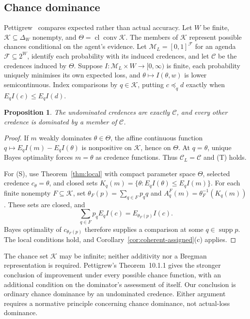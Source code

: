 \documentclass[11pt]{article}
\newtheorem{proposition}[theorem]{Proposition}
\theoremstyle{definition}
\theoremstyle{remark}
\newcommand{\M}{\mathcal M}
\newcommand{\C}{\mathcal C}
\newcommand{\supp}{\operatorname{supp}}
\begin{document}
\subsection{Chance dominance}\label{sec:chance}
Pettigrew~\cite[Chapter~10]{Pettigrew2016} compares expected rather than actual accuracy. Let $W$ be finite, $\mathcal K\subseteq\Delta_W$ nonempty, and $\Theta=\operatorname{cl}\operatorname{conv}\mathcal K$. The members of $\mathcal K$ represent possible chances conditional on the agent's evidence. Let $\M_L=[0,1]^{\mathcal F}$ for an agenda $\mathcal F\subseteq2^W$, identify each probability with its induced credences, and let $\C$ be the credences induced by $\Theta$. Suppose $I:\M_L\times W\to[0,\infty)$ is finite, each probability uniquely minimises its own expected loss, and $\theta\mapsto I(\theta,w)$ is lower semicontinuous. Index comparisons by $q\in\mathcal K$, putting $c\preceq_q d$ exactly when $E_qI(c)\le E_qI(d)$.
\begin{proposition}\label{prop:short-chance}
The undominated credences are exactly $\C$, and every other credence is dominated by a member of $\C$.
\end{proposition}
\begin{proof}
If $m$ weakly dominates $\theta\in\Theta$, the affine continuous function $q\mapsto E_qI(m)-E_qI(\theta)$ is nonpositive on $\mathcal K$, hence on $\Theta$. At $q=\theta$, unique Bayes optimality forces $m=\theta$ as credence functions. Thus $\C_L=\C$ and (T) holds.

For (S), use Theorem~\ref{thm:local} with compact parameter space $\Theta$, selected credence $c_\theta=\theta$, and closed sets $K_q(m)=\{\theta:E_qI(\theta)\le E_qI(m)\}$. For each finite nonempty $F\subseteq\mathcal K$, set $\theta_F(p)=\sum_{q\in F}p_qq$ and $A^F_q(m)=\theta_F^{-1}(K_q(m))$. These sets are closed, and
\[
\sum_{q\in F}p_qE_qI(c)=E_{\theta_F(p)}I(c).
\]
Bayes optimality of $c_{\theta_F(p)}$ therefore supplies a comparison at some $q\in\supp p$. The local conditions hold, and Corollary~\ref{cor:coherent-assigned}(c) applies.
\end{proof}
The chance set $\mathcal K$ may be infinite; neither additivity nor a Bregman representation is required. Pettigrew's Theorem~10.1.1 gives the stronger conclusion of improvement under every possible chance function, with an additional condition on the dominator's assessment of itself. Our conclusion is ordinary chance dominance by an undominated credence. Either argument requires a normative principle concerning chance dominance, not actual-loss dominance.




\end{document}
